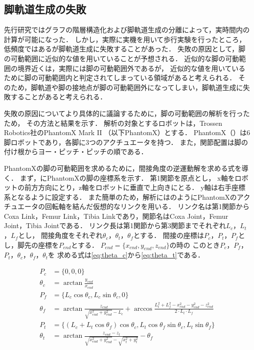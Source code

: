 \subsection{脚軌道生成の失敗}
先行研究ではグラフの階層構造化および脚軌道生成の分離によって，実時間内の計算が可能になった．
しかし，実際に実機を用いて歩行実験を行ったところ，低頻度ではあるが脚軌道生成に失敗することがあった．
失敗の原因として，脚の可動範囲に近似的な値を用いていることが予想される．
近似的な脚の可動範囲の境界近くは，実際には脚の可動範囲外であるが，
近似的な値を用いているために脚の可動範囲内と判定されてしまっている領域があると考えられる．
そのため，脚軌道や脚の接地点が脚の可動範囲外になってしまい，脚軌道生成に失敗することがあると考えられる．

失敗の原因についてより具体的に議論するために，脚の可動範囲の解析を行ったため，
その方法と結果を示す．
解析の対象とするロボットは，Trossen Robotics社のPhantomX Mark I\hspace{-1.2pt}I \cite{cita:phantom_x_mark_2}  %
（以下PhantomX）とする．
PhantomX（）は6脚ロボットであり，各脚に3つのアクチュエータを持つ．
また，関節配置は脚の付け根からヨー・ピッチ・ピッチの順である．

PhantomXの脚の可動範囲を求めるために，間接角度の逆運動解を求める式を導く．
まず，にPhantomXの脚の座標系を示す．
第1関節を原点とし，
x軸をロボットの前方方向にとり，z軸をロボットに垂直で上向きにとる．
y軸は右手座標系となるように設定する．
また簡単のため，解析にはのようにPhantomXのアクチュエータの回転軸を結んだ仮想的なリンクを用いる．
リンク名は第1関節からCoxa Link，Femur Link，Tibia Linkであり，関節名はCoxa Joint，Femur Joint，Tibia Jointである．
リンク長は第1関節から第3関節までそれぞれ$L_c$，$L_t$，$L_f$とし，
間接角度をそれぞれ$\theta_c$，$\theta_t$，$\theta_f$とする．
間接の座標は$P_c$，$P_t$，$P_f$とし，脚先の座標を$P_{end}$とする．
$P_{end} = \{x_{end},y_{end},z_{end}\}$の時の
このとき$P_c$，$P_f$，$P_t$，$\theta_c$，$\theta_f$，$\theta_t$を
求める式は\eqref{eq:theta_c}から\eqref{eq:theta_t}である．

\begin{align}
  P_c &= \{0,0,0\} \label{eq:theta_c} \\
  \theta_c &= \arctan \frac{y_{end}}{x_{end}}  \\
  P_f &= \{L_c \cos \theta_c, L_c \sin \theta_c, 0\}  \\
  \theta_f &= \arctan \frac{z_{end}}{\sqrt{x_{end}^2 + y_{end}^2} - L_c} + 
  \arccos \frac{L_t^2 + L_f^2 - x_{end}^2 - y_{end}^2 - z_{end}^2}{2 \cdot L_t \cdot L_f} \\
  P_t &= \{(L_c + L_t \cos \theta_f)\cos \theta_c ,
                  L_t \cos \theta_f \sin \theta_c , 
                  L_t \sin \theta_f\}  \\
  \theta_t &= \arctan \frac{z_{end} - z_t}{\sqrt{x_{end}^2 + y_{end}^2} - 
              \sqrt{x_t^2 + y_t^2}} - \theta_f \label{eq:theta_t} 
\end{align}

